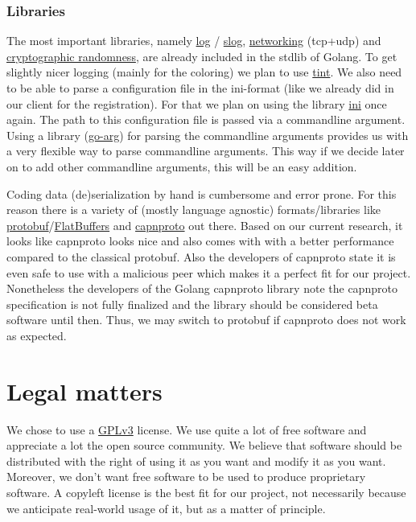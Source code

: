 \documentclass[a4paper,english,10pt,NET]{tumarticle}
\begin{document}
\subsubsection{Libraries}
The most important libraries, namely
\href{https://pkg.go.dev/log}{log}
/
\href{https://pkg.go.dev/log/slog@go1.22.2}{slog},
\href{https://pkg.go.dev/net}{networking} (tcp+udp)
and
\href{https://pkg.go.dev/crypto/rand}{cryptographic randomness},
are already included in the stdlib of Golang.
To get slightly nicer logging (mainly for the coloring) we plan to use \href{github.com/lmittmann/tint}{tint}.
We also need to be able to parse a configuration file in the ini-format (like we already did in our client for the registration).
For that we plan on using the library \href{gopkg.in/ini.v1}{ini} once again.
The path to this configuration file is passed via a commandline argument.
Using a library (\href{https://github.com/alexflint/go-arg}{go-arg}) for parsing the commandline arguments provides us with a very flexible way to parse commandline arguments.
This way if we decide later on to add other commandline arguments, this will be an easy addition.

Coding data (de)serialization by hand is cumbersome and error prone.
For this reason there is a variety of (mostly language agnostic) formats/libraries like \href{https://protobuf.dev/}{protobuf}/\href{https://flatbuffers.dev/}{FlatBuffers} and \href{https://capnproto.org/}{capnproto} out there.
Based on our current research, it looks like capnproto looks nice and also comes with with a better performance compared to the classical protobuf.
Also the developers of capnproto state it is even safe to use with a malicious peer which makes it a perfect fit for our project.
Nonetheless the developers of the Golang capnproto library note the capnproto specification is not fully finalized and the library should be considered beta software until then.
Thus, we may switch to protobuf if capnproto does not work as expected.

\section{Legal matters}
We chose to use a \href{https://www.gnu.org/licenses/quick-guide-gplv3.html}{GPLv3} license.
We use quite a lot of free software and appreciate a lot the open source community. We believe that software should be distributed with the right of using it as you want and modify it as you want. Moreover, we don't want free software to be used to produce proprietary software. A copyleft license is the best fit for our project, not necessarily because we anticipate real-world usage of it, but as a matter of principle.
\end{document}
